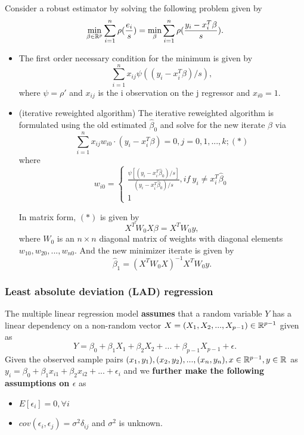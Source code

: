 \begin{refsection}
\begin{lemma}\cite[373]{montgomery2012introduction}
Consider a robust estimator by solving the following problem given by
$$\min_{\beta \in \mathbb{R}^p} \sum_{i=1}^{n} \rho(\frac{e_i}{s}) = \min_{\beta} \sum_{i=1}^{n} \rho(\frac{y_i - x_i^T\beta}{s}).$$
\begin{itemize}
	\item The first order necessary condition for the minimum is given by
	$$\sum_{i=1}^{n} x_{ij}\psi((y_i-x_i^T\beta)/s),$$
where $\psi = \rho'$ and $x_{ij}$ is the i observation on the j regressor and $x_{i0}=1$.	
\item (iterative reweighted algorithm) The iterative reweighted algorithm is formulated using the old estimated $\hat{\beta}_0$ and solve for the new iterate $\beta$ via
	$$\sum_{i=1}^{n} x_{ij}w_{i0}\cdot (y_i-x_i^T\beta) = 0, j=0,1,...,k; (*)$$
where 
$$w_{i0} = \begin{cases*}
\frac{\psi[(y_i-x_i^T\hat{\beta}_0)/s]}{(y_i-x_i^T\hat{\beta}_0)/s}, if~y_i\neq x_i^T\hat{\beta}_0 \\
1
\end{cases*}$$	

In matrix form, $(*)$ is given by
$$X^TW_0X\beta = X^TW_0y,$$
where $W_0$ is an $n\times n$ diagonal matrix of weights with diagonal elements $w_{10},w_{20},...,w_{n0}$. 
And the new minimizer iterate is given by
$$\hat{\beta}_1 = (X^TW_0X)^{-1}X^TW_0y.$$
\end{itemize}
\end{lemma}


\subsubsection{Least absolute deviation (LAD) regression}

\begin{definition}\label{ch:statistical-models:th:multipleLinearRegressionLeastAbsoluteDeviation}	The multiple linear regression model \textbf{assumes} that a random variable $Y$ has a linear dependency on a non-random vector $X = (X_1,X_2,...,X_{p-1}) \in \mathbb{R}^{p-1}$ given as
	$$Y = \beta_0 + \beta_1 X_1 +\beta_2 X_2 + ... +\beta_{p-1} X_{p-1} + \epsilon.$$
	Given the observed sample pairs $(x_1,y_1),(x_2,y_2),..., (x_n,y_n), x\in \mathbb{R}^{p-1}, y\in \mathbb{R}$ as $y_i = \beta_0 + \beta_1 x_{i1} + \beta_2 x_{i2} + ... + \epsilon_i$ and we \textbf{further make the following assumptions on $\epsilon$} as
	\begin{itemize}
		\item $E[\epsilon_i] = 0,\forall i$
		\item $cov(\epsilon_i,\epsilon_j) = \sigma^2\delta_{ij}$ and $\sigma^2$ is unknown.
	\end{itemize} 	
	

\end{definition}
\end{refsection}
